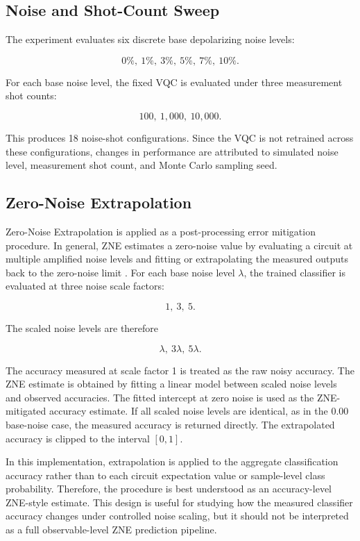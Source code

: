 \documentclass[conference]{IEEEtran}
\begin{document}
\subsection{Noise and Shot-Count Sweep}

The experiment evaluates six discrete base depolarizing noise levels:

\[
0\%,\ 1\%,\ 3\%,\ 5\%,\ 7\%,\ 10\%.
\]

For each base noise level, the fixed VQC is evaluated under three measurement
shot counts:

\[
100,\ 1{,}000,\ 10{,}000.
\]

This produces 18 noise-shot configurations. Since the VQC is not retrained
across these configurations, changes in performance are attributed to simulated
noise level, measurement shot count, and Monte Carlo sampling seed.

\subsection{Zero-Noise Extrapolation}

Zero-Noise Extrapolation is applied as a post-processing error mitigation
procedure. In general, ZNE estimates a zero-noise value by evaluating a circuit
at multiple amplified noise levels and fitting or extrapolating the measured
outputs back to the zero-noise limit \cite{b_koenig2024, b_mohammadipour2025}.
For each base noise level $\lambda$, the trained classifier is evaluated at
three noise scale factors:

\[
1,\ 3,\ 5.
\]

The scaled noise levels are therefore

\[
\lambda,\ 3\lambda,\ 5\lambda.
\]

The accuracy measured at scale factor 1 is treated as the raw noisy accuracy.
The ZNE estimate is obtained by fitting a linear model between scaled noise
levels and observed accuracies. The fitted intercept at zero noise is used as
the ZNE-mitigated accuracy estimate. If all scaled noise levels are identical,
as in the 0.00 base-noise case, the measured accuracy is returned directly. The
extrapolated accuracy is clipped to the interval $[0,1]$.

In this implementation, extrapolation is applied to the aggregate
classification accuracy rather than to each circuit expectation value or
sample-level class probability. Therefore, the procedure is best understood
as an accuracy-level ZNE-style estimate. This design is useful for studying
how the measured classifier accuracy changes under controlled noise
scaling, but it should not be interpreted as a full observable-level ZNE
prediction pipeline.
\end{document}
